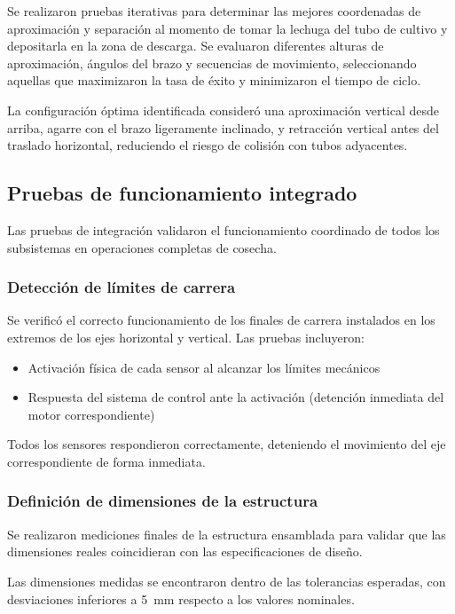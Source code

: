 Se realizaron pruebas iterativas para determinar las mejores coordenadas de aproximación y separación al momento de tomar la lechuga del tubo de cultivo y depositarla en la zona de descarga. Se evaluaron diferentes alturas de aproximación, ángulos del brazo y secuencias de movimiento, seleccionando aquellas que maximizaron la tasa de éxito y minimizaron el tiempo de ciclo.

La configuración óptima identificada consideró una aproximación vertical desde arriba, agarre con el brazo ligeramente inclinado, y retracción vertical antes del traslado horizontal, reduciendo el riesgo de colisión con tubos adyacentes.

\subsection{Pruebas de funcionamiento integrado}

Las pruebas de integración validaron el funcionamiento coordinado de todos los subsistemas en operaciones completas de cosecha.

\subsubsection{Detección de límites de carrera}

Se verificó el correcto funcionamiento de los finales de carrera instalados en los extremos de los ejes horizontal y vertical. Las pruebas incluyeron:

\begin{itemize}
    \item Activación física de cada sensor al alcanzar los límites mecánicos
    \item Respuesta del sistema de control ante la activación (detención inmediata del motor correspondiente)
\end{itemize}

Todos los sensores respondieron correctamente, deteniendo el movimiento del eje correspondiente de forma inmediata.

\subsubsection{Definición de dimensiones de la estructura}

Se realizaron mediciones finales de la estructura ensamblada para validar que las dimensiones reales coincidieran con las especificaciones de diseño.

Las dimensiones medidas se encontraron dentro de las tolerancias esperadas, con desviaciones inferiores a 5~mm respecto a los valores nominales.

